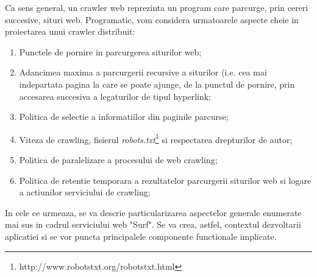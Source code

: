 Ca sens general, un crawler web reprezinta un program care parcurge, prin cereri succesive, situri web. Programatic, vom considera urmatoarele aspecte cheie in proiectarea unui crawler distribuit:

\begin{enumerate}

	\item{Punctele de pornire in parcurgerea siturilor web;}
	
	\item{Adancimea maxima a parcurgerii recursive a siturilor (i.e. cea mai indepartata pagina la care se poate ajunge, de la punctul de pornire, prin accesarea succesiva a legaturilor de tipul hyperlink;}
	
	\item{Politica de selectie a informatiilor din paginile parcurse\cite{web-crawler-selection-policy};}
	
	\item{Viteza de crawling, fisierul \emph{robots.txt}\footnote{http://www.robotstxt.org/robotstxt.html} si respectarea drepturilor de autor;}
	
	\item{Politica de paralelizare a procesului de web crawling;}
	
	\item{Politica de retentie temporara a rezultatelor parcurgerii siturilor web si logare a actiunilor serviciului de crawling;}
	
\end{enumerate}

In cele ce urmeaza, se va descrie particularizarea aspectelor generale enumerate mai sus in cadrul serviciului web "Surf". Se va crea, astfel, contextul dezvoltarii aplicatiei si se vor puncta principalele componente functionale implicate.
